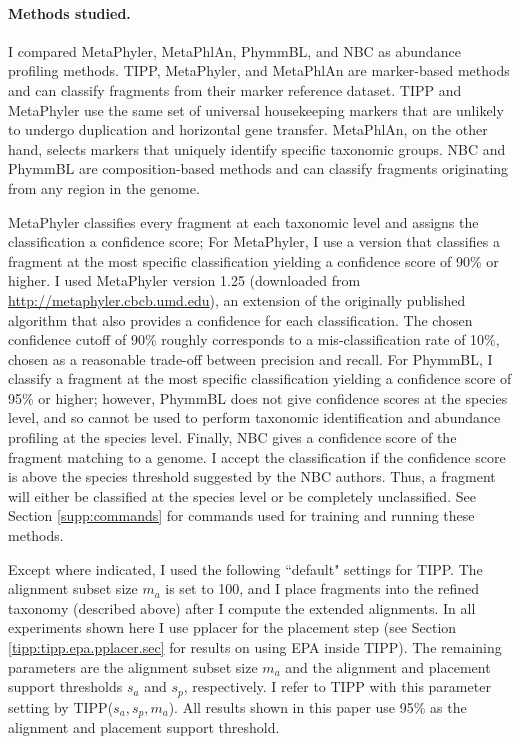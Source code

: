\paragraph{\bf Methods studied. }
I compared MetaPhyler, MetaPhlAn, PhymmBL, and NBC as abundance profiling methods.  
TIPP, MetaPhyler, and MetaPhlAn are marker-based methods and can classify fragments from their marker reference dataset.  TIPP and MetaPhyler use the same set of universal 
housekeeping markers that are unlikely to undergo duplication and horizontal gene transfer.  MetaPhlAn, on the other hand, selects markers that uniquely identify specific taxonomic groups.  NBC and PhymmBL are composition-based methods and can classify fragments originating from any region in the genome.

MetaPhyler classifies every
fragment at each taxonomic level and assigns
the classification a confidence score;
For MetaPhyler, I use a version that
classifies a fragment at the 
most specific classification yielding a confidence 
score of 90\% or higher.  
I used MetaPhyler version 1.25 
(downloaded from \url{http://metaphyler.cbcb.umd.edu}), 
an extension of the originally published algorithm that also provides a 
confidence for each classification.  
The chosen confidence cutoff of 
90\% roughly corresponds to a mis-classification 
rate of 10\%, chosen as a reasonable trade-off between precision and recall.  
For PhymmBL, I classify a fragment at the most 
specific classification yielding a confidence score 
of 95\% or higher;  however, PhymmBL does not 
give confidence scores at the species level, and so 
cannot be used to perform taxonomic identification and 
abundance profiling at the species level.  
Finally,  NBC gives a confidence score of the fragment matching to a genome.  I accept the classification if the confidence score is above the species threshold suggested by the NBC authors.  Thus, a fragment will either be classified at the species level or be completely unclassified.  See Section \ref{supp:commands} 
for commands used for training and running these methods.

Except where indicated, I used the
following ``default" settings for TIPP. 
The 
alignment subset size $m_a$ is
set to 100,
and I place fragments into
the refined taxonomy
(described above)
after I compute the extended alignments.
In all experiments shown here I use
pplacer for the placement step (see Section \ref{tipp:tipp.epa.pplacer.sec} 
for results on using EPA inside TIPP).
The remaining parameters are the alignment subset size $m_a$
and the alignment and placement support thresholds $s_a$ and $s_p$,
respectively. I refer to TIPP with this parameter setting by TIPP($s_a,s_p,m_a$).  All results shown in this paper use 95\% as the alignment and placement support threshold.

